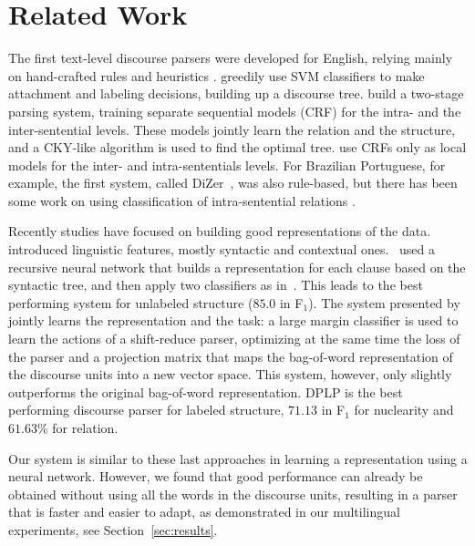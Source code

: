 \documentclass[11pt]{article}
\begin{document}
\section{Related Work}
\label{sec:related}


The first text-level discourse parsers were developed for English, relying mainly on hand-crafted rules and heuristics \cite{marcu:rhetorical:2000,carlson:building:2001}. 
 greedily use SVM classifiers to make attachment and labeling decisions, building up a discourse tree.   build a two-stage parsing system, training separate sequential models (CRF) for the intra- and the inter-sentential levels. These models jointly learn  the relation and the structure, and a CKY-like algorithm is used to find the optimal tree.  use CRFs only as local models for the inter- and intra-sententials levels. 
For Brazilian Portuguese, for example, the first system, called DiZer~\cite{pardo:development:2008,maziero:dizer:2011}, was also rule-based, but there has been some work on using classification of intra-sentential relations \cite{maziero:adaptation:2015}. 

Recently studies have focused on building good representations of the data.  introduced linguistic features, mostly syntactic and contextual ones. ~used a recursive neural network that builds a representation for each clause based on the syntactic tree, and then apply two classifiers as in~. This leads to the best performing system for unlabeled structure ($85.0$ in F$_1$). The system presented by~ jointly learns the representation and the task: a large margin classifier is used to learn the actions of a shift-reduce parser, optimizing at the same time the loss of the parser and a projection matrix that maps the bag-of-word representation of the discourse units into a new vector space. 
This system, however, only slightly outperforms the original bag-of-word representation. 
DPLP is the best performing discourse parser for labeled structure, $71.13$ in F$_1$ for nuclearity and $61.63$\% for relation.

Our system is similar to these last approaches in learning a representation using a neural network.  
However, we found that good performance can already be obtained without using all the words in the discourse units, resulting in a parser that is faster and easier to adapt, as demonstrated in our multilingual experiments,  see Section~\ref{sec:results}. 
\end{document}
